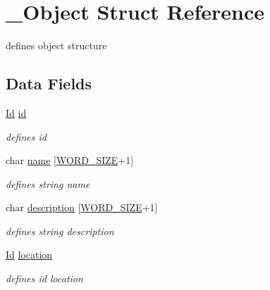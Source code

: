 \hypertarget{struct__Object}{}\section{\+\_\+\+Object Struct Reference}
\label{struct__Object}


defines object structure  


\subsection*{Data Fields}
\begin{DoxyCompactItemize}
\item 
\mbox{\label{struct__Object_a3cff7a0e8dc4e9d23895ed9af1b7653a}} 
\hyperlink{types_8h_a845e604fb28f7e3d97549da3448149d3}{Id} \hyperlink{struct__Object_a3cff7a0e8dc4e9d23895ed9af1b7653a}{id}
\begin{DoxyCompactList}\small\item\em defines id \end{DoxyCompactList}\item 
\mbox{\label{struct__Object_a03fb9b8d91f071e8e30d669be79cc040}} 
char \hyperlink{struct__Object_a03fb9b8d91f071e8e30d669be79cc040}{name} \mbox{[}\hyperlink{types_8h_a92ed8507d1cd2331ad09275c5c4c1c89}{W\+O\+R\+D\+\_\+\+S\+I\+ZE}+1\mbox{]}
\begin{DoxyCompactList}\small\item\em defines string name \end{DoxyCompactList}\item 
\mbox{\label{struct__Object_add691deed525492ad692cc2f5bccfe90}} 
char \hyperlink{struct__Object_add691deed525492ad692cc2f5bccfe90}{description} \mbox{[}\hyperlink{types_8h_a92ed8507d1cd2331ad09275c5c4c1c89}{W\+O\+R\+D\+\_\+\+S\+I\+ZE}+1\mbox{]}
\begin{DoxyCompactList}\small\item\em defines string description \end{DoxyCompactList}\item 
\mbox{\label{struct__Object_a3c596b8898734de2f71fd1a33dfa72fb}} 
\hyperlink{types_8h_a845e604fb28f7e3d97549da3448149d3}{Id} \hyperlink{struct__Object_a3c596b8898734de2f71fd1a33dfa72fb}{location}
\begin{DoxyCompactList}\small\item\em defines id location \end{DoxyCompactList}\item 

\end{DoxyCompactItemize}
